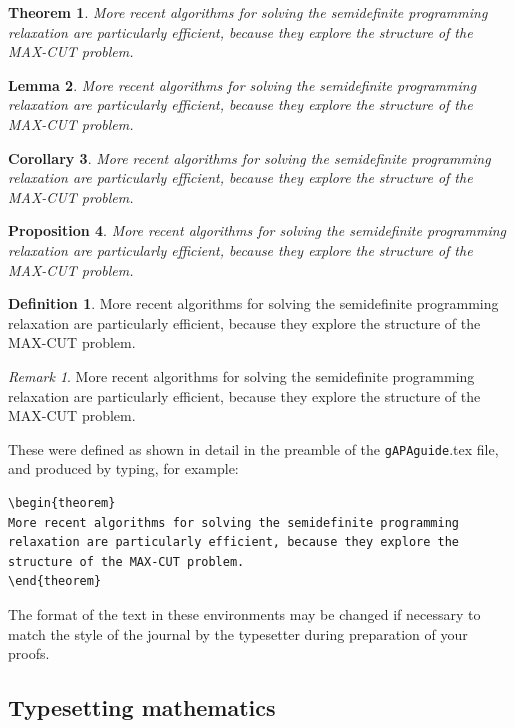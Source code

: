 \documentclass{gAPA2e}
\theoremstyle{plain}
\newtheorem{theorem}{Theorem}[section]
\newtheorem{corollary}[theorem]{Corollary}
\newtheorem{lemma}[theorem]{Lemma}
\newtheorem{proposition}[theorem]{Proposition}
\theoremstyle{remark}
\newtheorem{remark}{Remark}
\theoremstyle{definition}
\newtheorem{definition}{Definition}
\begin{document}
\begin{theorem}
More recent algorithms for solving the semidefinite programming
relaxation are particularly efficient, because they explore the structure
of the MAX-CUT problem.
\end{theorem}
\begin{lemma}
More recent algorithms for solving the semidefinite programming
relaxation are particularly efficient, because they explore the structure
of the MAX-CUT problem.
\end{lemma}
\begin{corollary}
More recent algorithms for solving the semidefinite programming
relaxation are particularly efficient, because they explore the
structure of the MAX-CUT problem.
\end{corollary}
\begin{proposition}
More recent algorithms for solving the semidefinite programming
relaxation are particularly efficient, because they explore the
structure of the MAX-CUT problem.
\end{proposition}
\begin{definition}
More recent algorithms for solving the semidefinite programming
relaxation are particularly efficient, because they explore the
structure of the MAX-CUT problem.
\end{definition}
\begin{remark}
More recent algorithms for solving the semidefinite programming
relaxation are particularly efficient, because they explore the
structure of the MAX-CUT problem.
\end{remark}

\noindent These were defined as shown in detail in the preamble of the \texttt{gAPAguide}.tex file, and produced by typing, for example:
%
\begin{verbatim}
\begin{theorem}
More recent algorithms for solving the semidefinite programming
relaxation are particularly efficient, because they explore the
structure of the MAX-CUT problem.
\end{theorem}
\end{verbatim}
%
The format of the text in these environments may be changed if necessary to match the style of the journal by the typesetter during preparation of your proofs.


\subsection{Typesetting mathematics}\label{TMth}
\end{document}
